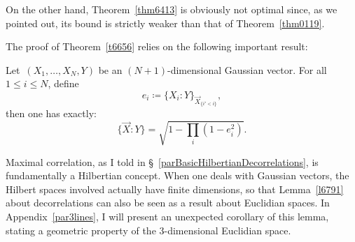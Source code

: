 \begin{Rmk}
On the other hand, Theorem~\ref{thm6413}
is obviously not optimal since, as we pointed out, its bound is strictly weaker
than that of Theorem~\ref{thm0119}.
\end{Rmk}

The proof of Theorem~\ref{t6656} relies on the following important result:
%
\begin{Lem}\label{l6791}
Let~$(X_1,\ldots,X_N,Y)$ be an $(N+1)$-dimensional Gaussian vector.
For all~$1\leq i\leq N$, define
\[ e_i \coloneqq \{ X_i : Y \}_{\vec{X}_{\{i'<i\}}} ,\]
then one has exactly:
\[\label{f1922} \{ \vec{X} : Y \} = \sqrt{1-\prod_{i}(1-e_i^2)} .\]
\end{Lem}

\begin{Rmk}\label{rmk>3lines}
Maximal correlation, as I told in \S~\ref{parBasicHilbertianDecorrelations},
is fundamentally a Hilbertian concept. When one deals with Gaussian vectors,
the Hilbert spaces involved actually have finite dimensions,
so that Lemma~\ref{l6791} about decorrelations can also be seen as a result about Euclidian spaces.
In Appendix~\ref{par3lines}, I will present an unexpected corollary of this lemma,
stating a geometric property of the $3$-dimensional Euclidian space.
\end{Rmk}

